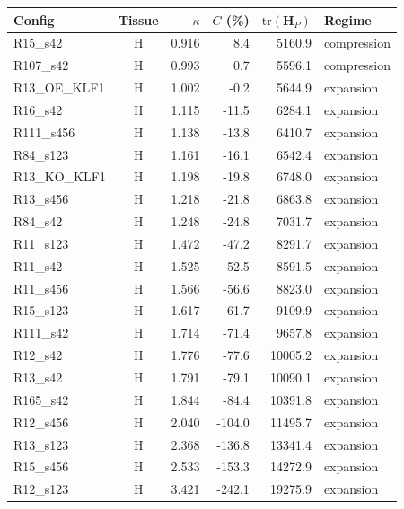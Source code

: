 \documentclass[11pt,a4paper]{article}
\begin{document}
\vspace{0.5cm}
\begin{tabular}{lcrrrl}
\toprule
\textbf{Config} & \textbf{Tissue} & \textbf{$\kappa$} & \textbf{$C$ (\%)} & \textbf{$\mathrm{tr}(\mathbf{H}_P)$} & \textbf{Regime} \\
\midrule
R15\_s42          & H &    0.916 &      8.4 &     5160.9 & compression \\
R107\_s42         & H &    0.993 &      0.7 &     5596.1 & compression \\
R13\_OE\_KLF1     & H &    1.002 &     -0.2 &     5644.9 & expansion \\
R16\_s42          & H &    1.115 &    -11.5 &     6284.1 & expansion \\
R111\_s456        & H &    1.138 &    -13.8 &     6410.7 & expansion \\
R84\_s123         & H &    1.161 &    -16.1 &     6542.4 & expansion \\
R13\_KO\_KLF1     & H &    1.198 &    -19.8 &     6748.0 & expansion \\
R13\_s456         & H &    1.218 &    -21.8 &     6863.8 & expansion \\
R84\_s42          & H &    1.248 &    -24.8 &     7031.7 & expansion \\
R11\_s123         & H &    1.472 &    -47.2 &     8291.7 & expansion \\
R11\_s42          & H &    1.525 &    -52.5 &     8591.5 & expansion \\
R11\_s456         & H &    1.566 &    -56.6 &     8823.0 & expansion \\
R15\_s123         & H &    1.617 &    -61.7 &     9109.9 & expansion \\
R111\_s42         & H &    1.714 &    -71.4 &     9657.8 & expansion \\
R12\_s42          & H &    1.776 &    -77.6 &    10005.2 & expansion \\
R13\_s42          & H &    1.791 &    -79.1 &    10090.1 & expansion \\
R165\_s42         & H &    1.844 &    -84.4 &    10391.8 & expansion \\
R12\_s456         & H &    2.040 &   -104.0 &    11495.7 & expansion \\
R13\_s123         & H &    2.368 &   -136.8 &    13341.4 & expansion \\
R15\_s456         & H &    2.533 &   -153.3 &    14272.9 & expansion \\
R12\_s123         & H &    3.421 &   -242.1 &    19275.9 & expansion \\

\end{tabular}
\end{document}
